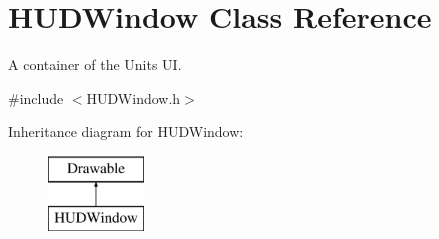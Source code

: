\hypertarget{class_h_u_d_window}{}\section{H\+U\+D\+Window Class Reference}
\label{class_h_u_d_window}


A container of the Units UI.  




{\ttfamily \#include $<$H\+U\+D\+Window.\+h$>$}

Inheritance diagram for H\+U\+D\+Window\+:\begin{figure}[H]
\begin{center}
\leavevmode
\includegraphics[height=2.000000cm]{class_h_u_d_window}
\end{center}
\end{figure}
